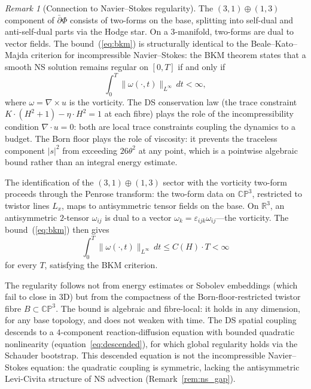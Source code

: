\documentclass[11pt,a4paper]{article}
\theoremstyle{definition}
\theoremstyle{remark}
\newtheorem{remark}[theorem]{Remark}
\newcommand{\CP}{\mathbb{CP}}
\newcommand{\R}{\mathbb{R}}
\newcommand{\dbar}{\bar{\partial}}
\begin{document}
\begin{remark}[Connection to Navier--Stokes regularity]\label{rem:NS}
The $(3,1)\oplus(1,3)$ component of $\dbar\Phi$ consists of two-forms on the base, splitting into self-dual and anti-self-dual parts via the Hodge star. On a $3$-manifold, two-forms are dual to vector fields. The bound~(\ref{eq:bkm}) is structurally identical to the Beale--Kato--Majda criterion for incompressible Navier--Stokes: the BKM theorem states that a smooth NS solution remains regular on $[0,T]$ if and only if
\[
\int_0^T\!\|\omega(\cdot,t)\|_{L^\infty}\,dt<\infty,
\]
where $\omega=\nabla\times u$ is the vorticity. The DS conservation law (the trace constraint $K\cdot(H^2+1)-\eta\cdot H^2=1$ at each fibre) plays the role of the incompressibility condition $\nabla\cdot u=0$: both are local trace constraints coupling the dynamics to a budget. The Born floor plays the role of viscosity: it prevents the traceless component $|s|^2$ from exceeding $26\theta^2$ at any point, which is a pointwise algebraic bound rather than an integral energy estimate.

The identification of the $(3,1)\oplus(1,3)$ sector with the vorticity two-form proceeds through the Penrose transform: the two-form data on $\CP^3$, restricted to twistor lines $L_x$, maps to antisymmetric tensor fields on the base. On $\R^3$, an antisymmetric $2$-tensor $\omega_{ij}$ is dual to a vector $\omega_k=\varepsilon_{ijk}\omega_{ij}$---the vorticity. The bound~(\ref{eq:bkm}) then gives
\[
\int_0^T\!\|\omega(\cdot,t)\|_{L^\infty}\,dt\leq C(H)\cdot T<\infty
\]
for every $T$, satisfying the BKM criterion.

The regularity follows not from energy estimates or Sobolev embeddings (which fail to close in $3$D) but from the compactness of the Born-floor-restricted twistor fibre $B\subset\CP^3$. The bound is algebraic and fibre-local: it holds in any dimension, for any base topology, and does not weaken with time. The DS spatial coupling descends to a $4$-component reaction-diffusion equation with bounded quadratic nonlinearity (equation~\ref{eq:descended}), for which global regularity holds via the Schauder bootstrap. This descended equation is not the incompressible Navier--Stokes equation: the quadratic coupling is symmetric, lacking the antisymmetric Levi-Civita structure of NS advection (Remark~\ref{rem:ns_gap}).
\end{remark}
\end{document}
